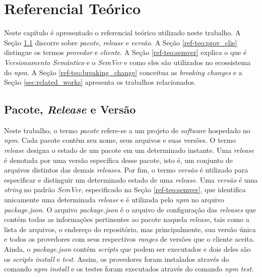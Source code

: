 \chapter{Referencial Teórico}
\label{cap:ref-teorico}
Neste capítulo é apresentado o referencial teórico utilizado neste trabalho. A Seção \ref{ref-teo:pac_rel_ver} discorre sobre \textit{pacote}, \textit{release} e \textit{versão}. A Seção \ref{ref-teo:prov_clie} distingue os termos \textit{provedor} e \textit{cliente}. A Seção \ref{ref-teo:semver} explica o que é \textit{Versionamento Semântico} e o \textit{SemVer} e como eles são utilizados no ecossistema do \textit{npm}. A Seção \ref{ref-teo:breaking_change} conceitua as \textit{breaking changes} e a Seção \ref{sec:related_works} apresenta os trabalhos relacionados.

\section{Pacote, \textit{Release} e Versão}
\label{ref-teo:pac_rel_ver}
Neste trabalho, o termo \textit{pacote} refere-se a um projeto de \textit{software} hospedado no \textit{npm}. Cada pacote contêm seu nome, seus arquivos e suas versões. O termo \textit{release} designa o estado de um pacote em um determinado instante. Uma \textit{release} é denotada por uma versão específica desse pacote, isto é, um conjunto de arquivos distintos das demais \textit{releases}. Por fim, o termo \textit{versão} é utilizado para especificar e distinguir um determinado estado de uma \textit{release}. Uma \textit{versão} é uma \textit{string} no padrão \textit{SemVer}, especificado na Seção \ref{ref-teo:semver}, que identifica unicamente uma determinada \textit{release} e é utilizada pelo \textit{npm} no arquivo \textit{package.json}. O arquivo \textit{package.json} é o arquivo de configuração das \textit{releases} que contém todas as informações pertinentes ao pacote naquela \textit{release}, tais como a lista de arquivos, o endereço do repositório, mas principalmente, sua versão única e todos os provedores com seus respectivos \textit{ranges} de versões que o cliente aceita. Ainda, o \textit{package.json} contém \textit{scripts} que podem ser executados e dois deles são os \textit{scripts install} e \textit{test}. Assim, os provedores foram instalados através do comando \textit{npm install} e os testes foram executados através do comando \textit{npm test}.

